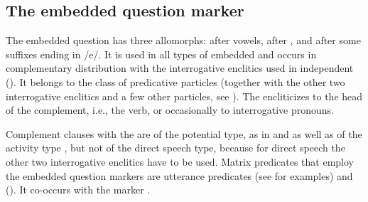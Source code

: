 
\subsection{The embedded question marker}
\label{ssec:The embedded question marker}

The embedded question  has three allomorphs:  after vowels,  after , and  after some suffixes ending in /e/. It is used in all types of embedded  and occurs in complementary distribution with the interrogative enclitics used in independent  (). It belongs to the class of predicative particles (together with the other two interrogative enclitics and a few other particles, see ). The  encliticizes to the head of the complement, i.e., the verb, or occasionally to interrogative pronouns. 

Complement clauses with the  are of the potential type, as in  and  as well as of the activity type , but not of the direct speech type, because for direct speech the other two interrogative enclitics have to be used. Matrix predicates that employ the embedded question markers are utterance predicates (see  for examples) and  (). It co-occurs with the  marker .

